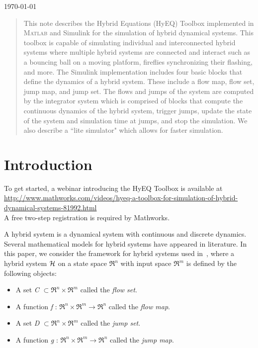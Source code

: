 \documentclass{article}
\newcommand{\matlab}{\textsc{Matlab}}
\begin{document}
\begin{center}
{\today}
\end{center}


\begin{abstract}
This note describes the Hybrid Equations (HyEQ) Toolbox implemented in 
\matlab{} and Simulink for the simulation of hybrid dynamical systems. 
This toolbox is capable of simulating individual and interconnected 
hybrid systems where multiple hybrid systems are connected and interact 
such as a bouncing ball on a moving platform, fireflies synchronizing their flashing, and more. 
The Simulink implementation includes four basic blocks that define the dynamics of a hybrid system. 
These include a flow map, flow set, jump map, and jump set. The flows and jumps of the system are 
computed by the integrator system which is comprised of blocks that compute the continuous dynamics 
of the hybrid system, trigger jumps, update the state of the system and simulation time at jumps, 
and stop the simulation. We also describe a ``lite simulator" which allows for faster simulation.
\end{abstract}

\tableofcontents

\section{Introduction}
\begin{center}
\begin{framed}To get started, a webinar introducing the HyEQ Toolbox is available at\\
{\footnotesize\url{http://www.mathworks.com/videos/hyeq-a-toolbox-for-simulation-of-hybrid-dynamical-systems-81992.html}}\\
A free two-step registration is required by Mathworks.
\end{framed}
\end{center}

A hybrid system is a dynamical system with continuous and discrete dynamics. Several mathematical models for hybrid systems have appeared in literature. In this paper, we consider the framework for hybrid systems used in~\cite{SCN13,GST09,ST10,San11}, where a hybrid system $\mathcal{H}$ on a state space $\Re^n$ with input space $\Re^m$ is defined by the following objects:
\begin{itemize}
\item A set {\it C} $\subset \Re^n \times \Re^m$ called the {\it flow set}.
\item A function {\it f} : $\Re^n \times \Re^m \to \Re^n$ called the {\it flow map}.
\item A set {\it D} $\subset \Re^n \times \Re^m$ called the {\it jump set}.
\item A function {\it g} : $\Re^n \times \Re^m \to \Re^n$ called the {\it jump map}.
\end{itemize}
\end{document}
